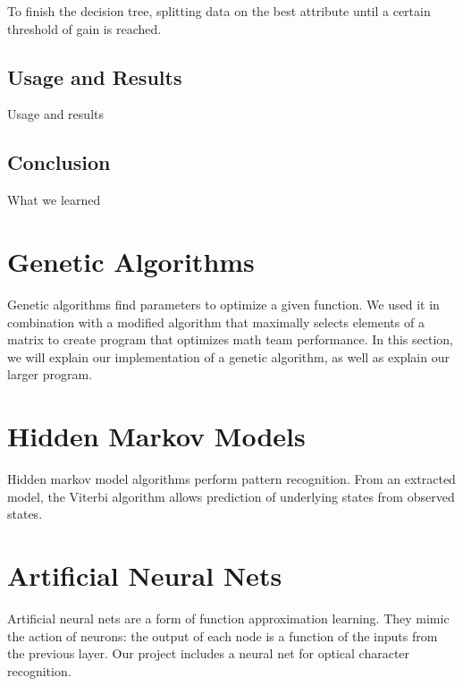 \documentclass[12pt,a4paper]{article}
\begin{document}
To finish the decision tree, splitting data on the best attribute until a certain threshold of gain is reached.

\subsection{Usage and Results}

Usage and results

\subsection{Conclusion}

What we learned

\section{Genetic Algorithms}

Genetic algorithms find parameters to optimize a given function. We used it in combination with a modified algorithm that maximally selects elements of a matrix to create program that optimizes math team performance. In this section, we will explain our implementation of a genetic algorithm, as well as explain our larger program.

\section{Hidden Markov Models} 
Hidden markov model algorithms perform pattern recognition. From an extracted model, the Viterbi algorithm allows prediction of underlying states from observed states. 

\section{Artificial Neural Nets}
Artificial neural nets are a form of function approximation learning. They mimic the action of neurons: the output of each node is a function of the inputs from the previous layer. Our project includes a neural net for optical character recognition.
\end{document}
